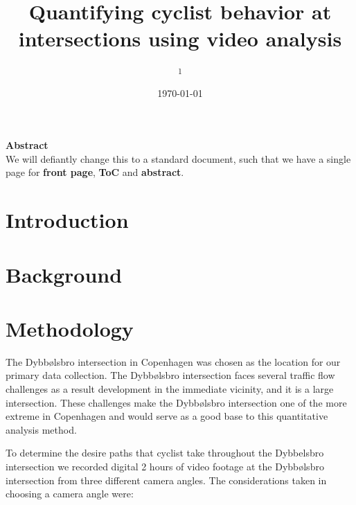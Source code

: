 \documentclass[10pt, a4paper, twocolumn]{article} %
\title{Quantifying cyclist behavior at intersections using video analysis} %
\author{
	\authorstyle{Edi Bergovic\textsuperscript{1} and Høgni Jacobsen\textsuperscript{1}} %
	\newline\newline %
	\textsuperscript{1}\institution{The IT University of Copenhagen, Copenhagen, Denmark}\\ %
}
\date{\today} %
\begin{document}
\maketitle %

\thispagestyle{firstpage} %


\noindent
\textbf{Abstract}
\ \\

\noindent
We will defiantly change this to a standard document, such that we have a single page for \textbf{front page}, 
\textbf{ToC} and \textbf{abstract}.


\section{Introduction}


\section{Background}


\section{Methodology}

The Dybbølsbro intersection in Copenhagen was chosen as the location for our primary data collection. 
The Dybbølsbro intersection faces several traffic flow challenges as a result development in the immediate vicinity, and it is a large intersection.
These challenges make the Dybbølsbro intersection one of the more extreme in Copenhagen and would serve as a good base to this quantitative analysis method. 

To determine the desire paths that cyclist take throughout the Dybbelsbro intersection we recorded digital 2 hours of video footage 
at the Dybbølsbro intersection from three different camera angles.
The considerations taken in choosing a camera angle were:
\end{document}
